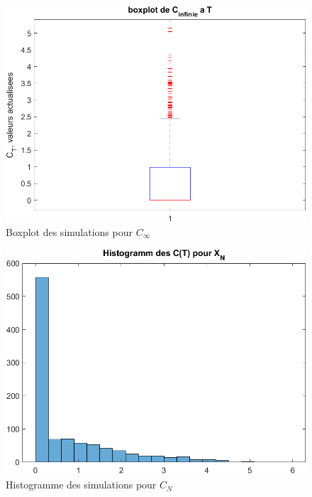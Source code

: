 \documentclass[a4paper,12pt]{scrartcl}
\begin{document}
\begin{figure}[h!]
  \begin{center}
    \includegraphics[width=14cm]{"graphiques/box_C_inf.png"}
    \caption{Boxplot des simulations pour $C_{\infty}$}
    \label{fig:box_C_inf}
  \end{center}
\end{figure}

\begin{figure}[h!]
  \begin{center}
    \includegraphics[width=14cm]{"graphiques/hist_C_N.png"}
    \caption{Histogramme des simulations pour $C_{N}$}
    \label{fig:hist_C_N}
  \end{center}
\end{figure}
\end{document}

